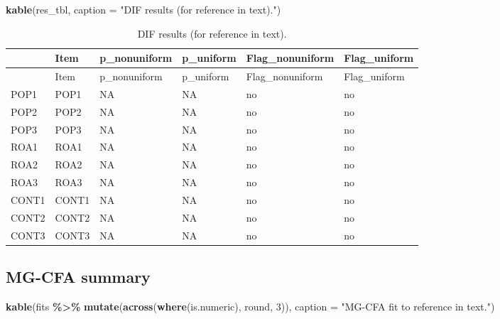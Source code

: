\documentclass[
  10pt,
]{article}
\newenvironment{Shaded}{\begin{snugshade}}{\end{snugshade}}
\newcommand{\AttributeTok}[1]{\textcolor[rgb]{0.13,0.29,0.53}{#1}}
\newcommand{\DecValTok}[1]{\textcolor[rgb]{0.00,0.00,0.81}{#1}}
\newcommand{\FunctionTok}[1]{\textcolor[rgb]{0.13,0.29,0.53}{\textbf{#1}}}
\newcommand{\NormalTok}[1]{#1}
\newcommand{\SpecialCharTok}[1]{\textcolor[rgb]{0.81,0.36,0.00}{\textbf{#1}}}
\newcommand{\StringTok}[1]{\textcolor[rgb]{0.31,0.60,0.02}{#1}}
\begin{document}
\begin{Shaded}
\begin{Highlighting}[]
\FunctionTok{kable}\NormalTok{(res\_tbl, }\AttributeTok{caption =} \StringTok{"DIF results (for reference in text)."}\NormalTok{)}
\end{Highlighting}
\end{Shaded}

\begin{longtable}[]{@{}llllll@{}}
\caption{DIF results (for reference in text).}\tabularnewline
\toprule\noalign{}
& Item & p\_nonuniform & p\_uniform & Flag\_nonuniform &
Flag\_uniform \\
\midrule\noalign{}
\endfirsthead
\toprule\noalign{}
& Item & p\_nonuniform & p\_uniform & Flag\_nonuniform &
Flag\_uniform \\
\midrule\noalign{}
\endhead
\bottomrule\noalign{}
\endlastfoot
POP1 & POP1 & NA & NA & no & no \\
POP2 & POP2 & NA & NA & no & no \\
POP3 & POP3 & NA & NA & no & no \\
ROA1 & ROA1 & NA & NA & no & no \\
ROA2 & ROA2 & NA & NA & no & no \\
ROA3 & ROA3 & NA & NA & no & no \\
CONT1 & CONT1 & NA & NA & no & no \\
CONT2 & CONT2 & NA & NA & no & no \\
CONT3 & CONT3 & NA & NA & no & no \\
\end{longtable}

\hypertarget{mg-cfa-summary}{%
\subsection{MG-CFA summary}\label{mg-cfa-summary}}

\begin{Shaded}
\begin{Highlighting}[]
\FunctionTok{kable}\NormalTok{(fits }\SpecialCharTok{\%\textgreater{}\%} \FunctionTok{mutate}\NormalTok{(}\FunctionTok{across}\NormalTok{(}\FunctionTok{where}\NormalTok{(is.numeric), round, }\DecValTok{3}\NormalTok{)),}
      \AttributeTok{caption =} \StringTok{"MG{-}CFA fit to reference in text."}\NormalTok{)}
\end{Highlighting}
\end{Shaded}
\end{document}
